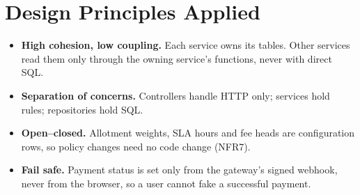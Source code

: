 \documentclass[11pt,a4paper]{report}
\begin{document}
\section{Design Principles Applied}
\begin{itemize}
  \item \textbf{High cohesion, low coupling.} Each service owns its tables. Other services read them only through the owning service's functions, never with direct SQL.
  \item \textbf{Separation of concerns.} Controllers handle HTTP only; services hold rules; repositories hold SQL.
  \item \textbf{Open--closed.} Allotment weights, SLA hours and fee heads are configuration rows, so policy changes need no code change (NFR7).
  \item \textbf{Fail safe.} Payment status is set only from the gateway's signed webhook, never from the browser, so a user cannot fake a successful payment.
\end{itemize}
\end{document}

